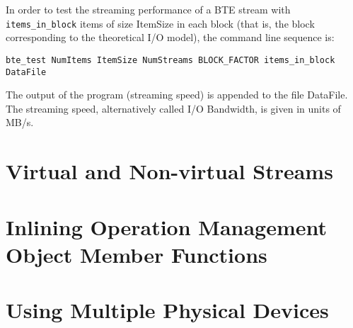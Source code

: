 In order to test the streaming performance of a BTE stream with 
\verb|items_in_block| items of size ItemSize in each block (that is, the
block corresponding to the theoretical I/O model), the command line 
sequence is:

\begin{verbatim}
bte_test NumItems ItemSize NumStreams BLOCK_FACTOR items_in_block DataFile 
\end{verbatim}

The output of the program (streaming speed) is appended to the file
DataFile. The streaming speed, alternatively called I/O Bandwidth,
is given in units of MB/s.

\section{Virtual and Non-virtual Streams}


\section{Inlining Operation Management Object Member Functions}


\section{Using Multiple Physical Devices}
